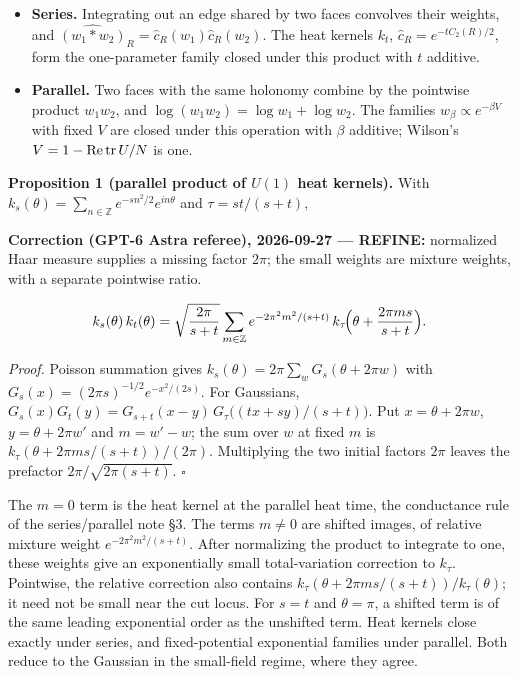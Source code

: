 \documentclass[11pt,a4paper]{article}
\newcommand{\tightlist}{\setlength{\itemsep}{0pt}\setlength{\parskip}{0pt}}
\begin{document}
\begin{itemize}
\tightlist
\item
  \textbf{Series.} Integrating out an edge shared by two faces convolves
  their weights, and
  \(\widehat{(w_1*w_2)}_R=\hat c_R(w_1)\hat c_R(w_2)\). The heat kernels
  \(k_t\), \(\hat c_R=e^{-tC_2(R)/2}\), form the one-parameter family
  closed under this product with \(t\) additive.
\item
  \textbf{Parallel.} Two faces with the same holonomy combine by the
  pointwise product \(w_1w_2\), and \(\log(w_1w_2)=\log w_1+\log w_2\).
  The families \(w_\beta\propto e^{-\beta V}\) with fixed \(V\) are
  closed under this operation with \(\beta\) additive; Wilson's
  \(V=1-{\rm Re\,tr}\,U/N\) is one.
\end{itemize}

\textbf{Proposition 1 (parallel product of \(U(1)\) heat kernels).} With
\(k_s(\theta)=\sum_{n\in\mathbb Z}e^{-sn^2/2}e^{in\theta}\) and
\(\tau=st/(s+t)\),

\textbf{Correction (GPT-6 Astra referee), 2026-09-27 --- REFINE:}
normalized Haar measure supplies a missing factor \(2\pi\); the small
weights are mixture weights, with a separate pointwise ratio.

\[k_s(\theta)\,k_t(\theta)=\sqrt{\frac{2\pi}{s+t}}\sum_{m\in\mathbb Z}
e^{-2\pi^2m^2/(s+t)}\,k_\tau\!\Bigl(\theta+\frac{2\pi ms}{s+t}\Bigr).\]

\emph{Proof.} Poisson summation gives
\(k_s(\theta)=2\pi\sum_wG_s(\theta+2\pi w)\) with
\(G_s(x)=(2\pi s)^{-1/2}e^{-x^2/(2s)}\). For Gaussians,
\(G_s(x)G_t(y)=G_{s+t}(x-y)\,G_\tau\bigl((tx+sy)/(s+t)\bigr)\). Put
\(x=\theta+2\pi w\), \(y=\theta+2\pi w'\) and \(m=w'-w\); the sum over
\(w\) at fixed \(m\) is \(k_\tau(\theta+2\pi ms/(s+t))/(2\pi)\).
Multiplying the two initial factors \(2\pi\) leaves the prefactor
\(2\pi/\sqrt{2\pi(s+t)}\). \(\square\)

The \(m=0\) term is the heat kernel at the parallel heat time, the
conductance rule of the series/parallel note §3. The terms \(m\neq0\)
are shifted images, of relative mixture weight \(e^{-2\pi^2m^2/(s+t)}\).
After normalizing the product to integrate to one, these weights give an
exponentially small total-variation correction to \(k_\tau\). Pointwise,
the relative correction also contains
\(k_\tau(\theta+2\pi ms/(s+t))/k_\tau(\theta)\); it need not be small
near the cut locus. For \(s=t\) and \(\theta=\pi\), a shifted term is of
the same leading exponential order as the unshifted term. Heat kernels
close exactly under series, and fixed-potential exponential families
under parallel. Both reduce to the Gaussian in the small-field regime,
where they agree.
\end{document}
